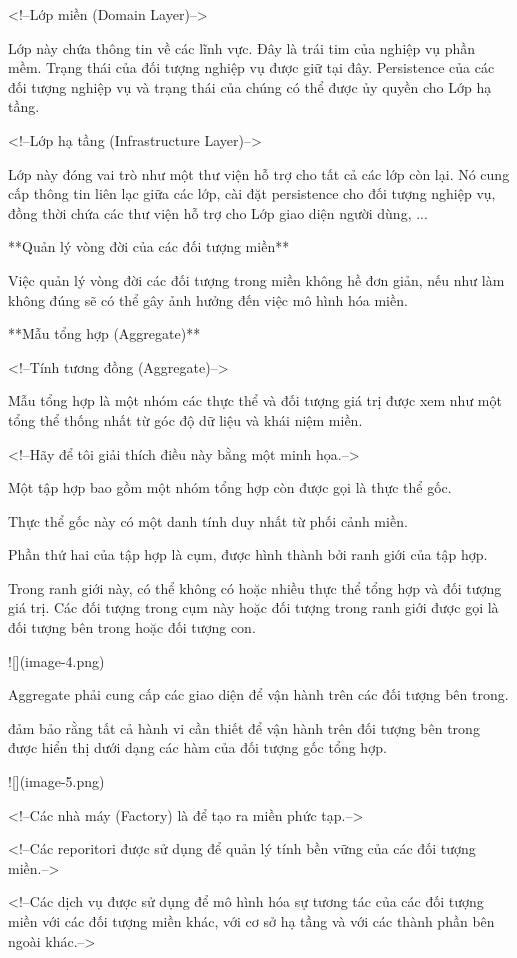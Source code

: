<!--Lớp miền (Domain Layer)-->

Lớp này chứa thông tin về các lĩnh vực. Đây là trái tim của nghiệp vụ phần mềm. Trạng thái của đối tượng nghiệp vụ được giữ tại đây. Persistence của các đối tượng nghiệp vụ và trạng thái của chúng có thể được ủy quyền cho Lớp hạ tầng.

<!--Lớp hạ tầng (Infrastructure Layer)-->

Lớp này đóng vai trò như một thư viện hỗ trợ cho tất cả các lớp còn lại. Nó cung cấp thông tin liên lạc giữa các lớp, cài đặt persistence cho đối tượng nghiệp vụ, đồng thời chứa các thư viện hỗ trợ cho Lớp giao diện người dùng, ...

**Quản lý vòng đời của các đối tượng miền**

Việc quản lý vòng đời các đối tượng trong miền không hề đơn giản, nếu như làm không đúng sẽ có thể gây ảnh hưởng đến việc mô hình hóa miền.

**Mẫu tổng hợp (Aggregate)**

<!--Tính tương đồng (Aggregate)-->

Mẫu tổng hợp là một nhóm các thực thể và đối tượng giá trị được xem như một tổng thể thống nhất từ ​​góc độ dữ liệu và khái niệm miền.

<!--Hãy để tôi giải thích điều này bằng một minh họa.-->

Một tập hợp bao gồm một nhóm tổng hợp còn được gọi là thực thể gốc.

Thực thể gốc này có một danh tính duy nhất từ ​​phối cảnh miền.

Phần thứ hai của tập hợp là cụm, được hình thành bởi ranh giới của tập hợp.

Trong ranh giới này, có thể không có hoặc nhiều thực thể tổng hợp và đối tượng giá trị. Các đối tượng trong cụm này hoặc đối tượng trong ranh giới được gọi là đối tượng bên trong hoặc đối tượng con.

![](image-4.png)

Aggregate phải cung cấp các giao diện để vận hành trên các đối tượng bên trong.

đảm bảo rằng tất cả hành vi cần thiết để vận hành trên đối tượng bên trong được hiển thị dưới dạng các hàm của đối tượng gốc tổng hợp.

![](image-5.png)

<!--Các nhà máy (Factory) là để tạo ra miền phức tạp.-->

<!--Các reporitori được sử dụng để quản lý tính bền vững của các đối tượng miền.-->

<!--Các dịch vụ được sử dụng để mô hình hóa sự tương tác của các đối tượng miền với các đối tượng miền khác, với cơ sở hạ tầng và với các thành phần bên ngoài khác.-->


